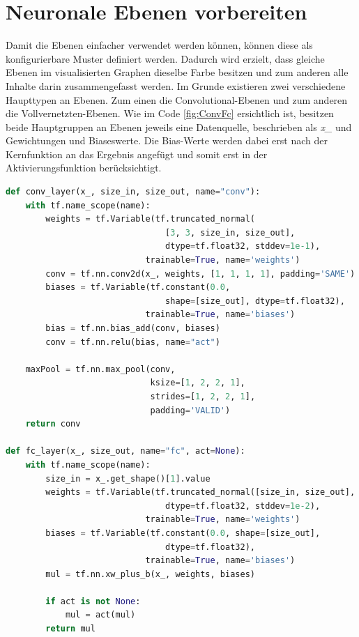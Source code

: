 \section{Neuronale Ebenen vorbereiten}

Damit die Ebenen einfacher verwendet werden können, können diese als konfigurierbare Muster definiert werden. 
Dadurch wird erzielt, dass gleiche Ebenen im visualisierten Graphen dieselbe Farbe besitzen und zum anderen alle Inhalte darin zusammengefasst werden. 
Im Grunde existieren zwei verschiedene Haupttypen an Ebenen. 
Zum einen die Convolutional-Ebenen und zum anderen die Vollvernetzten-Ebenen. 
Wie im Code \ref{fig:ConvFc} ersichtlich ist, besitzen beide Hauptgruppen an Ebenen jeweils eine Datenquelle, beschrieben als \textit{x\_} und Gewichtungen und Biaseswerte. 
Die Bias-Werte werden dabei erst nach der Kernfunktion an das Ergebnis angefügt und somit erst in der Aktivierungsfunktion berücksichtigt. 
\begin{lstlisting}[caption={Definition der Convolutional- und Vollvernetzten-Ebenen},label=fig:ConvFc,captionpos=b,language=Python]
def conv_layer(x_, size_in, size_out, name="conv"):
    with tf.name_scope(name):
        weights = tf.Variable(tf.truncated_normal(
        						[3, 3, size_in, size_out], 
        						dtype=tf.float32, stddev=1e-1), 
							trainable=True, name='weights')
        conv = tf.nn.conv2d(x_, weights, [1, 1, 1, 1], padding='SAME')
        biases = tf.Variable(tf.constant(0.0, 
								shape=[size_out], dtype=tf.float32), 
                            trainable=True, name='biases')
        bias = tf.nn.bias_add(conv, biases)
        conv = tf.nn.relu(bias, name="act")

    maxPool = tf.nn.max_pool(conv, 
                             ksize=[1, 2, 2, 1],
                             strides=[1, 2, 2, 1],
                             padding='VALID')
    return conv

def fc_layer(x_, size_out, name="fc", act=None):
    with tf.name_scope(name):
        size_in = x_.get_shape()[1].value
        weights = tf.Variable(tf.truncated_normal([size_in, size_out], 
								dtype=tf.float32, stddev=1e-2), 
							trainable=True, name='weights')
        biases = tf.Variable(tf.constant(0.0, shape=[size_out], 
								dtype=tf.float32), 
							trainable=True, name='biases')
        mul = tf.nn.xw_plus_b(x_, weights, biases)
        
        if act is not None:
            mul = act(mul)
        return mul
\end{lstlisting}

